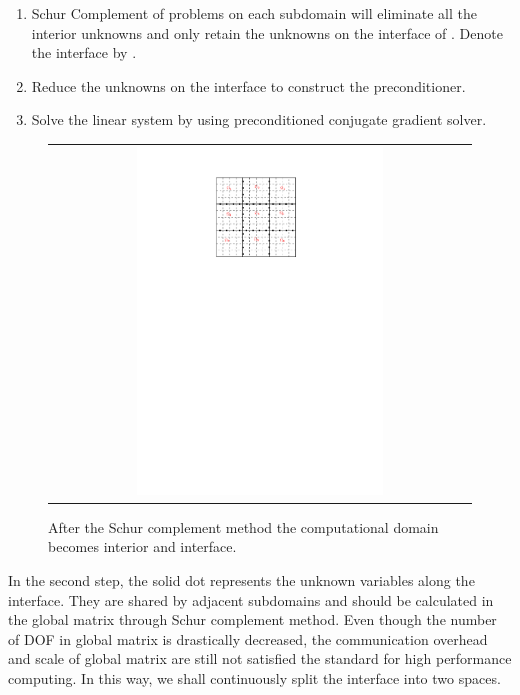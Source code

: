 \begin{enumerate}
	\item	Schur Complement \cite{duff1986direct} of problems on each subdomain  will eliminate all the interior unknowns and only retain the unknowns on the interface of . Denote the interface by .
	\item	Reduce the unknowns on the interface to construct the preconditioner.
	\item	Solve the linear system by using preconditioned conjugate gradient solver.
\end{enumerate}


\begin{figure}[h]
	\centering
	\begin{tabular}{c}
		\includegraphics[width=0.6\textwidth]{./pics/domain2.pdf}
	\end{tabular}
	\caption{\footnotesize After the Schur complement method the computational domain becomes interior and interface.}\label{fig4: domain1}
\end{figure}

In the second step, the solid dot represents the unknown variables along the interface. They are shared by adjacent subdomains and should be calculated in the global matrix through Schur complement method. Even though the number of DOF in global matrix is drastically decreased, the communication overhead and scale of global matrix are still not satisfied the standard for high performance computing. In this way, we shall continuously split the interface into two spaces.


